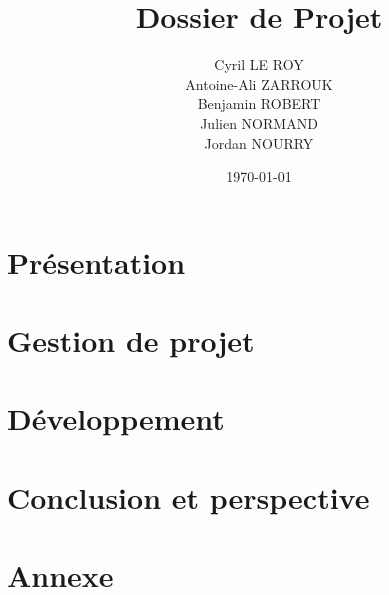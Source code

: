 \documentclass{eXia_report}
\title{Dossier de Projet}
\author{Cyril LE ROY \\ Antoine-Ali ZARROUK \\ Benjamin ROBERT \\ Julien NORMAND \\ Jordan NOURRY}
\date{\today}
\begin{document}
\maketitle
\clearpage
\tableofcontents
\clearpage

%
%

\clearpage
\part{Présentation}
\section{}

%
%

\clearpage
\part{Gestion de projet}
\section{}

%
%

\clearpage
\part{Développement}
\section{}

%
%

\clearpage
\part{Conclusion et perspective}
\section{}

%
%

\clearpage
\appendix
\part{Annexe}
\end{document}
